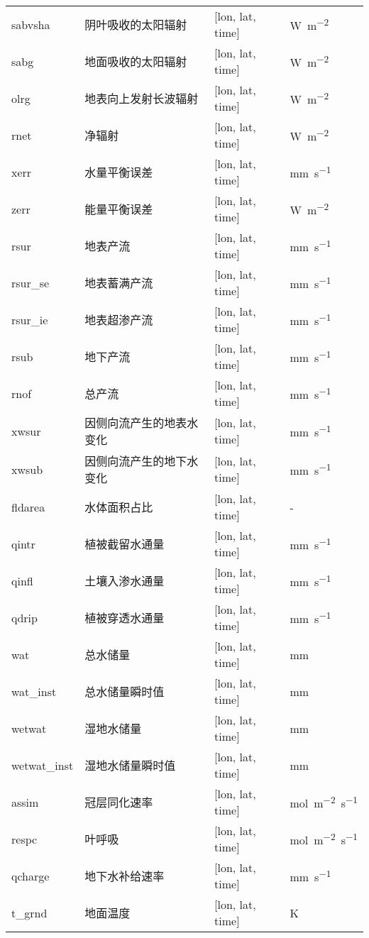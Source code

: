 {\begin{longtable}[htbp]{lp{}p{}l}
sabvsha & 阴叶吸收的太阳辐射 & {[}lon, lat, time{]}  & \unit{W.m^{-2}} \\
sabg & 地面吸收的太阳辐射 & {[}lon, lat, time{]}  & \unit{W.m^{-2}} \\
olrg & 地表向上发射长波辐射 & {[}lon, lat, time{]}  & \unit{W.m^{-2}} \\
rnet & 净辐射 & {[}lon, lat, time{]}  & \unit{W.m^{-2}} \\
xerr & 水量平衡误差 & {[}lon, lat, time{]}  & \unit{mm.s^{-1}} \\
zerr & 能量平衡误差 & {[}lon, lat, time{]}  & \unit{W.m^{-2}} \\
rsur & 地表产流 & {[}lon, lat, time{]}  & \unit{mm.s^{-1}} \\
rsur\_se & 地表蓄满产流 & {[}lon, lat, time{]}  & \unit{mm.s^{-1}} \\
rsur\_ie & 地表超渗产流 & {[}lon, lat, time{]}  & \unit{mm.s^{-1}} \\
rsub & 地下产流 & {[}lon, lat, time{]}  & \unit{mm.s^{-1}} \\
rnof & 总产流 & {[}lon, lat, time{]}  & \unit{mm.s^{-1}} \\
xwsur & 因侧向流产生的地表水变化 & {[}lon, lat, time{]}  & \unit{mm.s^{-1}} \\
xwsub & 因侧向流产生的地下水变化 & {[}lon, lat, time{]}  & \unit{mm.s^{-1}} \\
fldarea & 水体面积占比 & {[}lon, lat, time{]}  & \unit{-} \\
qintr & 植被截留水通量 & {[}lon, lat, time{]}  & \unit{mm.s^{-1}} \\
qinfl & 土壤入渗水通量 & {[}lon, lat, time{]}  & \unit{mm.s^{-1}} \\
qdrip & 植被穿透水通量 & {[}lon, lat, time{]}  & \unit{mm.s^{-1}} \\
wat & 总水储量 & {[}lon, lat, time{]}  & mm \\
wat\_inst & 总水储量瞬时值 & {[}lon, lat, time{]}  & mm \\
wetwat & 湿地水储量 & {[}lon, lat, time{]}  & mm \\
wetwat\_inst & 湿地水储量瞬时值 & {[}lon, lat, time{]}  & mm \\
assim & 冠层同化速率 & {[}lon, lat, time{]}  & \unit{mol.m^{-2}.s^{-1}} \\
respc & 叶呼吸 & {[}lon, lat, time{]}  & \unit{mol.m^{-2}.s^{-1}} \\
qcharge & 地下水补给速率 & {[}lon, lat, time{]}  & \unit{mm.s^{-1}} \\
t\_grnd & 地面温度 & {[}lon, lat, time{]}  & K \\

\end{longtable}}
